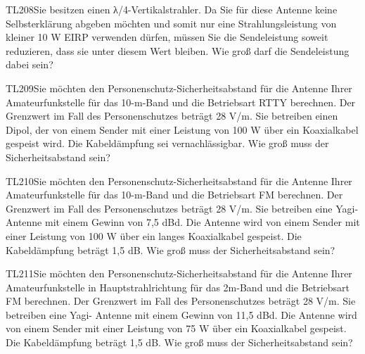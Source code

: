 \begin{question}{TL208}{Sie besitzen einen λ/4-Vertikalstrahler. Da Sie für diese Antenne keine Selbsterklärung abgeben möchten und somit nur eine Strahlungsleistung von kleiner 10 W EIRP verwenden dürfen, müssen Sie die Sendeleistung soweit reduzieren, dass sie unter diesem Wert bleiben. Wie groß darf die Sendeleistung dabei sein?}
\end{question}

\begin{question}{TL209}{Sie möchten den Personenschutz-Sicherheitsabstand für die Antenne Ihrer Amateurfunkstelle für das 10-m-Band und die Betriebsart RTTY berechnen. Der Grenzwert im Fall des Personenschutzes beträgt 28 V/m. Sie betreiben einen Dipol, der von einem Sender mit einer Leistung von 100 W über ein Koaxialkabel gespeist wird. Die Kabeldämpfung sei vernachlässigbar. Wie groß muss der Sicherheitsabstand sein?}
\end{question}

\begin{question}{TL210}{Sie möchten den Personenschutz-Sicherheitsabstand für die Antenne Ihrer Amateurfunkstelle für das 10-m-Band und die Betriebsart FM berechnen. Der Grenzwert im Fall des Personenschutzes beträgt 28 V/m. Sie betreiben eine Yagi-Antenne mit einem Gewinn von 7,5 dBd. Die Antenne wird von einem Sender mit einer Leistung von 100 W über ein langes Koaxialkabel gespeist. Die Kabeldämpfung beträgt 1,5 dB. Wie groß muss der Sicherheitsabstand sein?}
\end{question}

\begin{question}{TL211}{Sie möchten den Personenschutz-Sicherheitsabstand für die Antenne Ihrer Amateurfunkstelle in Hauptstrahlrichtung für das 2m-Band und die Betriebsart FM berechnen. Der Grenzwert im Fall des Personenschutzes beträgt 28 V/m. Sie betreiben eine Yagi- Antenne mit einem Gewinn von 11,5 dBd. Die Antenne wird von einem Sender mit einer Leistung von 75 W über ein Koaxialkabel gespeist. Die Kabeldämpfung beträgt 1,5 dB. Wie groß muss der Sicherheitsabstand sein?}
\end{question}

